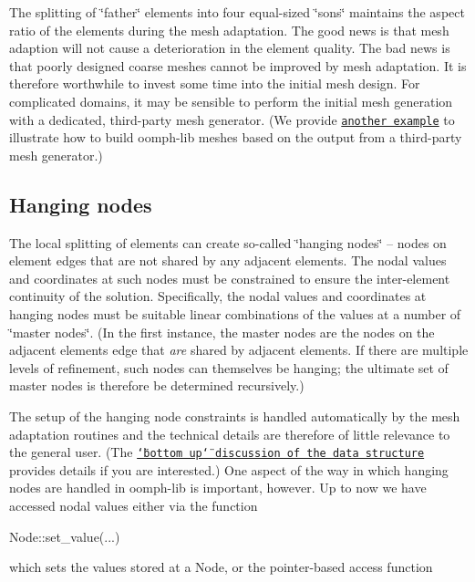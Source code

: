 The splitting of \char`\"{}father\char`\"{} elements into four equal-\/sized \char`\"{}sons\char`\"{} maintains the aspect ratio of the elements during the mesh adaptation. The good news is that mesh adaption will not cause a deterioration in the element quality. The bad news is that poorly designed coarse meshes cannot be improved by mesh adaptation. It is therefore worthwhile to invest some time into the initial mesh design. For complicated domains, it may be sensible to perform the initial mesh generation with a dedicated, third-\/party mesh generator. (We provide \href{../../../meshes/third_party_meshes/html/index.html}{\tt another example} to illustrate how to build {\ttfamily oomph-\/lib} meshes based on the output from a third-\/party mesh generator.)\hypertarget{index_hang}{}\subsection{Hanging nodes}\label{index_hang}
The local splitting of elements can create so-\/called \char`\"{}hanging
nodes\char`\"{} -- nodes on element edges that are not shared by any adjacent elements. The nodal values and coordinates at such nodes must be constrained to ensure the inter-\/element continuity of the solution. Specifically, the nodal values and coordinates at hanging nodes must be suitable linear combinations of the values at a number of \char`\"{}master nodes\char`\"{}. (In the first instance, the master nodes are the nodes on the adjacent element\textquotesingle{}s edge that {\itshape are} shared by adjacent elements. If there are multiple levels of refinement, such nodes can themselves be hanging; the ultimate set of master nodes is therefore be determined recursively.)

The setup of the hanging node constraints is handled automatically by the mesh adaptation routines and the technical details are therefore of little relevance to the general user. (The \href{../../../the_data_structure/html/index.html}{\tt \char`\"{}bottom up\char`\"{} discussion of the data structure} provides details if you are interested.) One aspect of the way in which hanging nodes are handled in {\ttfamily oomph-\/lib} is important, however. Up to now we have accessed nodal values either via the function


\begin{DoxyCode}
Node::set\_value(...)
\end{DoxyCode}


which sets the values stored at a {\ttfamily Node}, or the pointer-\/based access function


